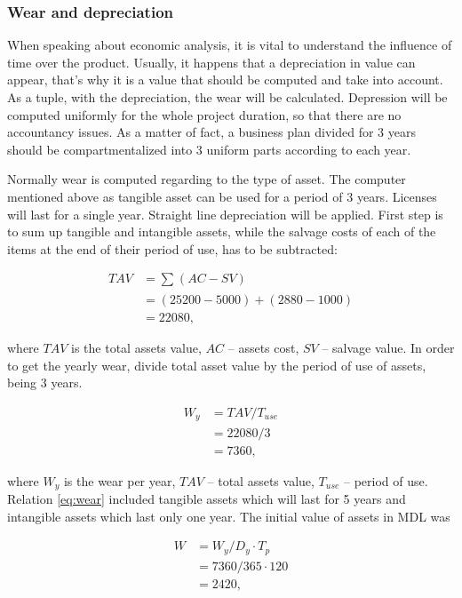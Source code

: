 \subsubsection{Wear and depreciation}
When speaking about economic analysis, it is vital to understand the influence of time over the product. Usually, it happens that a depreciation in value can appear, that's why it is a value that should be computed and take into account. As a tuple, with the depreciation, the wear will be calculated. Depression will be computed uniformly for the whole project duration, so that there are no accountancy issues. As a matter of fact, a business plan divided for 3 years should be compartmentalized into 3 uniform parts according to each year.


Normally wear is computed regarding to the type of asset. The computer mentioned above as tangible asset  can be used for a period of 3 years. Licenses will last for a single year. Straight line depreciation will be applied. First step is to sum up tangible and intangible assets, while the salvage costs of each of the items at the end of their period of use, has to be subtracted:

\begin{equation}
\begin{split}
TAV &= \sum_{} (AC - SV) \\
&= (25200 - 5000) + (2880 - 1000) \\
&= 22080,
\end{split}
\end{equation}

\noindent
where $TAV$ is the total assets value, $AC$ -- assets cost, $SV$ -- salvage value.
In order to get the yearly wear, divide total asset value by the period of use of assets, being 3 years.

\begin{equation} \label{eq:wear}
\begin{split}
W_y &= TAV / T_{use} \\
&= 22080/3\\
&= 7360,
\end{split}
\end{equation}

\noindent
where $W_y$ is the wear per year, $TAV$ -- total assets value, $T_{use}$ -- period of use. Relation \eqref{eq:wear} included tangible assets which will last for 5 years and intangible assets which last only one year. The initial value of assets in MDL was

\begin{equation}
\begin{split}
W &= W_y / D_y \cdot T_p\\
&= 7360  / 365  \cdot 120 \\
&= 2420,
\end{split}
\end{equation}
